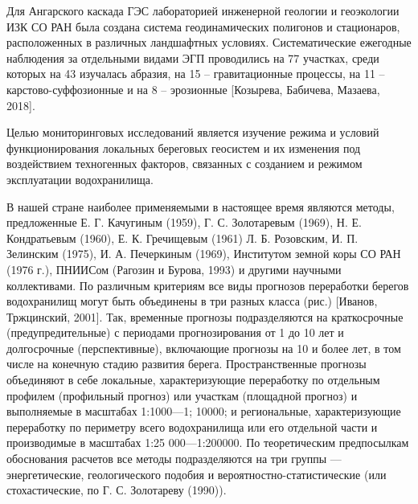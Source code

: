 \documentclass[732,14pt,final]{studrep}
\begin{document}
Для Ангарского каскада ГЭС лабораторией инженерной геологии и геоэкологии ИЗК СО РАН была создана система геодинамических полигонов и стационаров, расположенных в различных ландшафтных условиях. Систематические ежегодные наблюдения за отдельными видами ЭГП проводились на 77 участках, среди которых на 43 изучалась абразия, на 15 – гравитационные процессы, на 11 – карстово-суффозионные и на 8 – эрозионные [Козырева, Бабичева, Мазаева, 2018].

Целью мониторинговых исследований является изучение режима и условий функционирования локальных береговых геосистем и их изменения под воздействием техногенных факторов, связанных с созданием и режимом эксплуатации водохранилища.

В нашей стране наиболее применяемыми в настоящее время являются методы, предложенные Е. Г. Качугиным (1959), Г. С. Золотаревым (1969), Н. Е. Кондратьевым (1960), Е. К. Гречищевым (1961) Л. Б. Розовским, И. П. Зелинским (1975), И. А. Печеркиным (1969), Институтом земной коры СО РАН (1976 г.), ПНИИСом (Рагозин и Бурова, 1993) и другими научными коллективами.
По различным критериям все виды прогнозов переработки берегов водохранилищ могут быть объединены в три разных класса (рис.) [Иванов, Тржцинский, 2001]. Так, временные прогнозы подразделяются на краткосрочные (предупредительные) с периодами прогнозирования от 1 до 10 лет и долгосрочные (перспективные), включающие прогнозы на 10 и более лет, в том числе на конечную стадию развития берега. Пространственные прогнозы объединяют в себе локальные, ха­рактеризующие переработку по отдельным профилем (профильный прогноз) или участкам (площадной прогноз) и выполняемые в масштабах 1:1000—1; 10000; и региональные, характеризующие переработку по периметру всего водохранилища или его отдель­ной части и производимые в масштабах 1:25 000—1:200000. По теоретическим предпосылкам обоснования расчетов все методы подразделяются на три группы — энергетические, геологического подобия и вероятностно-статистические (или стохастические, по Г. С. Золотареву (1990)).
\end{document}
